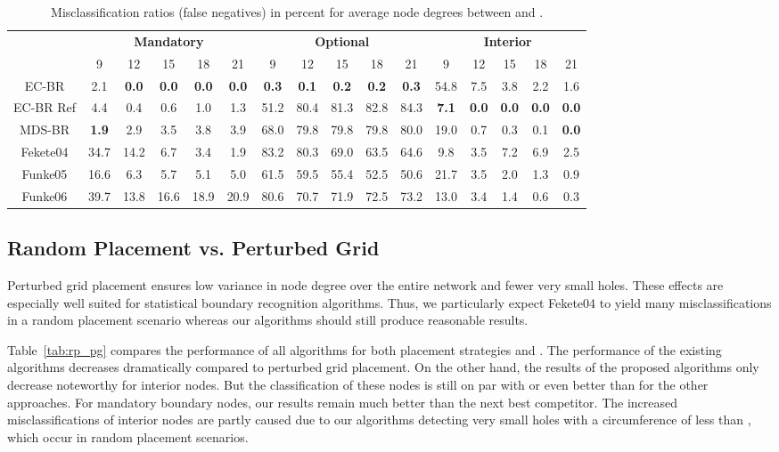 \documentclass{llncs}
\begin{document}
\begin{table}[t]
\setlength\tabcolsep{5pt}
\centering
\caption{Misclassification ratios (false negatives) in percent for average node degrees between  and .}\label{tab:net_density}
\begin{tabular}{c||ccccc||ccccc||ccccc}
& \multicolumn{5}{c||}{\bfseries Mandatory}& \multicolumn{5}{c||}{\bfseries Optional}& \multicolumn{5}{c}{\bfseries Interior} \\
 & 9 & 12 & 15 & 18 & 21 & 9 & 12 & 15 & 18 & 21 & 9 & 12 & 15 & 18 & 21 \\
\hline
EC-BR & 2.1 & \bfseries 0.0 & \bfseries 0.0 & \bfseries 0.0 & \bfseries 0.0 & \bfseries 0.3 & \bfseries 0.1 & \bfseries 0.2 & \bfseries 0.2 & \bfseries 0.3 & 54.8 & 7.5 & 3.8 & 2.2 & 1.6  \\
EC-BR Ref & 4.4 & 0.4 & 0.6 & 1.0 & 1.3 & 51.2 & 80.4 & 81.3 & 82.8 & 84.3 & \bfseries 7.1 & \bfseries 0.0 & \bfseries 0.0 & \bfseries 0.0 & \bfseries 0.0  \\

MDS-BR & \bfseries 1.9 & 2.9 & 3.5 & 3.8 & 3.9 & 68.0 & 79.8 & 79.8 & 79.8 & 80.0 & 19.0 & 0.7 & 0.3 & 0.1 & \bfseries 0.0  \\
\hline
Fekete04 & 34.7 & 14.2 & 6.7 & 3.4 & 1.9 & 83.2 & 80.3 & 69.0 & 63.5 & 64.6 & 9.8 & 3.5 & 7.2 & 6.9 & 2.5 \\
Funke05 & 16.6 & 6.3 & 5.7 & 5.1 & 5.0 & 61.5 & 59.5 & 55.4 & 52.5 & 50.6 & 21.7 & 3.5 & 2.0 & 1.3 & 0.9  \\
Funke06 & 39.7 & 13.8 & 16.6 & 18.9 & 20.9 & 80.6 & 70.7 & 71.9 & 72.5 & 73.2 & 13.0 & 3.4 & 1.4 & 0.6 & 0.3
\end{tabular}
\end{table}


\subsection{Random Placement vs. Perturbed Grid}
Perturbed grid placement ensures low variance in node degree over the entire network and fewer very small holes.
These effects are especially well suited for statistical boundary recognition algorithms.
Thus, we particularly expect Fekete04 to yield many misclassifications in a random placement scenario whereas our algorithms should still produce reasonable results.

Table~\ref{tab:rp_pg} compares the performance of all algorithms for both placement strategies and .
The performance of the existing algorithms decreases dramatically compared to perturbed grid placement.
On the other hand, the results of the proposed algorithms only decrease noteworthy for interior nodes.
But the classification of these nodes is still on par with or even better than for the other approaches.
For mandatory boundary nodes, our results remain much better than the next best competitor.
The increased misclassifications of interior nodes are partly caused due to our algorithms detecting very small holes with a circumference of less than , which occur in random placement scenarios.
\end{document}

